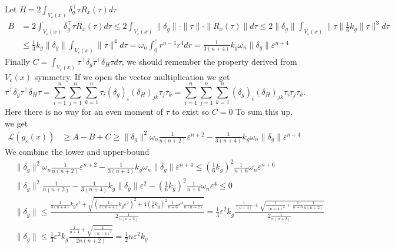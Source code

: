 Let \(B = 2\int_{V_{\varepsilon}(x)}\delta_g^\top\tau R_x(\tau)d\tau\) 
\begin{align*}
    B &= 2\int_{V_{\varepsilon}(x)}\delta_g^\top\tau R_x(\tau)d\tau \leq 2\int_{V_{\varepsilon}(x)}\|\delta_g\|\cdot\|\tau\|\cdot\| R_x(\tau)\|d\tau  \leq 2\|\delta_g\|\int_{V_{\varepsilon}(x)}\|\tau\|\tfrac{1}{6}k_g\|\tau\|^3d\tau \\
    & \leq \tfrac{1}{3}k_g\|\delta_g\|\int_{V_{\varepsilon}(x)}\|\tau\|^4d\tau = \omega_n\int_0^\varepsilon r^{n-1}r^4dr = \tfrac{1}{3(n+4)}k_g\omega_n\|\delta_g\|\varepsilon^{n+4}
\end{align*}
Finally \(C = \int_{V_{\varepsilon}(x)}\tau^\top\delta_g\tau^\top\delta_H\tau d\tau\), we should remember the property derived from \(V_{\varepsilon}(x)\) symmetry. If we open the vector multiplication we get
\[
\tau^\top \delta_g \tau^\top \delta_H \tau = \sum_{i=1}^n \sum_{j=1}^n \sum_{k=1}^n \tau_i (\delta_g)_i (\delta_H)_{jk} \tau_j \tau_k = \sum_{i=1}^n \sum_{j=1}^n \sum_{k=1}^n (\delta_g)_i (\delta_H)_{jk} \tau_i \tau_j \tau_k.
\]
Here there is no way for an even moment of \(\tau\) to exist so \(C = 0\)
To sum this up, we get
\begin{align*}
    \mathcal{L}(g_{\varepsilon}(x)) &\geq A - B + C \geq \|\delta_g\|^2\omega_n \frac{1}{n(n+2)}\varepsilon^{n+2} - \tfrac{1}{3(n+4)}k_g\omega_n\|\delta_g\|\varepsilon^{n+4}
\end{align*}
We combine the lower and upper-bound 
\begin{align*}
    & \|\delta_g\|^2\omega_n \frac{1}{n(n+2)}\varepsilon^{n+2} - \tfrac{1}{3(n+4)}k_g\omega_n\|\delta_g\|\varepsilon^{n+4} \leq \left( \tfrac{1}{6} k_g \right)^2 \tfrac{1}{n+6}\omega_n \varepsilon^{n+6}\\
    & \|\delta_g\|^2 \frac{1}{n(n+2)} - \tfrac{1}{3(n+4)}k_g\|\delta_g\|\varepsilon^{2} - ( \tfrac{1}{6} k_g )^2 \tfrac{1}{n+6}\omega_n \varepsilon^{4} \leq 0\\
     &\|\delta_g\| \leq \frac{\tfrac{1}{3(n+4)}k_g\varepsilon^{2} + \sqrt{(\tfrac{1}{3(n+4)}k_g\varepsilon^{2})^2 + 4(\tfrac{1}{6} k_g )^2 \tfrac{1}{n+6}\varepsilon^{4} \frac{1}{n(n+2)}}}{2\frac{1}{n(n+2)}} = \frac{1}{3}\varepsilon^2 k_g\frac{\tfrac{1}{(n+4)} + \sqrt{\tfrac{1}{(n+4)^2} + \tfrac{1}{n+6} \frac{1}{n(n+2)}}}{2\frac{1}{n(n+2)}} \\
     & \|\delta_g\| \leq \frac{1}{3}\varepsilon^2 k_g \tfrac{\frac{1}{n+4} + \sqrt{\frac{4}{(n+4)^2}}}{2n(n+2)} = \frac{1}{2}n\varepsilon^2 k_g
\end{align*}

